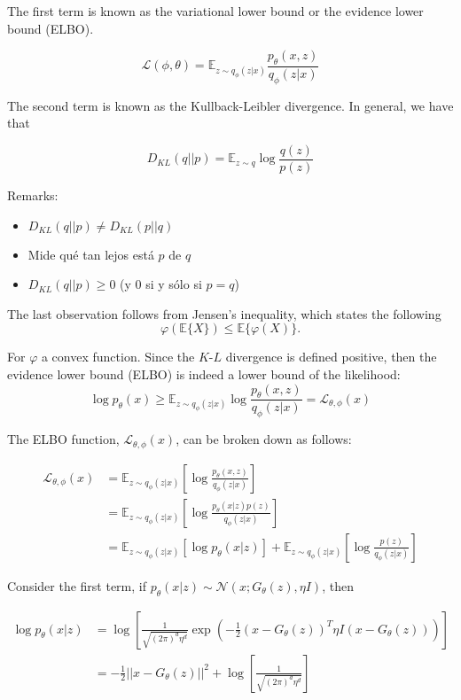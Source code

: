 \documentclass[twocolumn, 9pt]{article}
\begin{document}
The first term is known as the variational lower bound or the evidence lower bound (ELBO).

$$
\mathcal{L}(\phi, \theta) =  \mathbb{E}_{z\sim q_\phi(z|x)} \frac{p_\theta(x,z)}{q_\phi(z|x)}
$$

The second term is known as the Kullback-Leibler divergence. In general, we have that

\[
D_{KL}(q || p) = \mathbb{E}_{z\sim q} \log \frac{q(z)}{p(z)}
\]

Remarks:
\begin{itemize}
    \item \(D_{KL}(q || p) \neq D_{KL}(p || q)\)
    \item Mide qué tan lejos está \(p\) de \(q\)
    \item \(D_{KL}(q || p) \geq 0\) (y 0 si y sólo si \(p = q\))
\end{itemize}

The last observation follows from Jensen's inequality, which states the following
$$
{\varphi \left(\mathbb {E} \{X\}\right)\leq \mathbb {E} \{\varphi (X)\}.}
$$

For $\varphi$ a convex function. Since the \(K\)-\(L\) divergence is defined positive, then the evidence lower bound (ELBO) is indeed a lower bound of the likelihood:
\[
\log p_\theta(x) \geq \mathbb{E}_{z\sim q_\phi(z|x)} \log \frac{p_\theta(x,z)}{q_\phi(z|x)} = \mathcal{L}_{\theta, \phi}(x)
\]

The ELBO function, \(\mathcal{L}_{\theta,\phi}(x)\), can be broken down as follows:

\begin{align*}
\mathcal{L}_{\theta,\phi}(x) &= \mathbb{E}_{z\sim q_\phi(z|x)} \left[ \log \frac{p_\theta(x,z) }{q_\phi(z|x)} \right] \\
&= \mathbb{E}_{z\sim q_\phi(z|x)} \left[ \log \frac{p_\theta(x|z) p(z)}{q_\phi(z|x)}  \right] \\
&= \mathbb{E}_{z\sim q_\phi(z|x)} \left[ \log p_\theta(x|z) \right] + \mathbb{E}_{z\sim q_\phi(z|x)} \left[ \log \frac{p(z)}{q_\phi(z|x)} \right]
\end{align*}

Consider the first term, if $p_\theta(x|z)\sim\mathcal{N}(x; G_\theta(z), \eta I)$, then

\begin{align*}
\log p_\theta(x|z) &= \log \left[ \frac{1}{\sqrt{(2\pi)^d \eta^d}} \exp\left(-\frac{1}{2}(x - G_\theta(z))^T\eta I(x - G_\theta(z))\right) \right] \\
&= -\frac{1}{2} || x - G_\theta(z) ||^2 + \log \left[ \frac{1}{\sqrt{(2\pi)^d \eta^d}} \right]
\end{align*}
\end{document}
